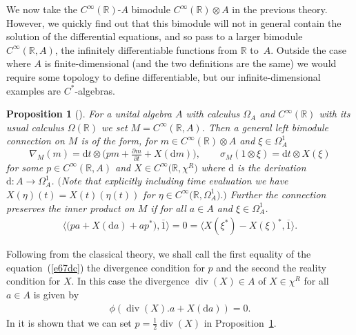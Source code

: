 \documentclass[pdftex]{sigma}
\numberwithin{equation}{section}
\newtheorem{Proposition}[Theorem]{Proposition}
 { \theoremstyle{definition}
\newtheorem{Definition}[Theorem]{Definition}
\newtheorem{Note}[Theorem]{Note}
\newtheorem{Example}[Theorem]{Example}
\newtheorem{Remark}[Theorem]{Remark} }
\newcommand{\extd}{\mathrm{d}}
\newcommand{\tens}{\mathop{\otimes}}
\newcommand{\R}{\mathbb{R}}
\newcommand{\<}{\langle}
\renewcommand{\>}{\rangle}
\begin{document}
We now take the $ C^{\infty}(\R) $-$ A $ bimodule $ C^{\infty}(\R) \tens A $ in the previous theory. However, we quickly find out that this bimodule will not in general contain the solution of the differential equations, and so pass to a larger bimodule $ C^{\infty}(\R, A) $, the infinitely differentiable functions from $ \R $ to~$ A $. Outside the case where $ A $ is finite-dimensional (and the two definitions are the same) we would require some topology to define differentiable, but our infinite-dimensional examples are $ C^{*} $-algebras.
\begin{Proposition}[\cite{Bgeo}] \label{prido}
	For a unital algebra $A$ with calculus $\Omega_A$ and $C^\infty(\R)$ with its usual calculus $\Omega(\R)$ we set $M=C^{\infty}(\R, A) $. Then a general left bimodule connection on $M$ is of the form, for $m\in C^\infty(\R)\tens A$ and $\xi\in\Omega^1_A$
	\[
	\nabla_M(m)=\extd t\tens \big(pm + \tfrac{\partial m}{\partial t} +X(\extd m)\big),\qquad \sigma_M(1\tens\xi)=\extd t\tens X(\xi)
	\]
	for some $p\in C^{\infty}(\R, A)$ and $X\in C^{\infty}\big(\R, \chi ^R\big)$ where $ \extd$ is the derivation $ \extd\colon A\rightarrow \Omega_{A}^{1} $. $\big($Note that explicitly including time evaluation we have
	$X(\eta)(t)=X(t)(\eta(t))$ for $\eta\in C^{\infty}\big(\R, \Omega^1_A\big).\big)$ Further the connection preserves the inner product on $M$ if for all $a\in A$ and $\xi\in\Omega^1_A$.
	\begin{gather}\label{e67dc}
			\<\big(pa+X(\extd a)+ap^*
		\big),\overline{1}\>=0 =\<X(\xi^*)-X(\xi)^*,\overline{1}\>.
	\end{gather}
\end{Proposition}

Following from the classical theory, we shall call the first equality of the equation~(\ref{e67dc}) the divergence condition for $p$ and the second the reality condition for $X$. In this case the divergence $ \operatorname{div} (X) \in A $ of $ X \in \chi^{R} $ for all $ a \in A $ is given by
\begin{align*}
\phi (\operatorname{div} (X).a+X(\extd a))=0.
\end{align*}
In \cite{Bgeo} it is shown that we can set $ p= \frac{1}{2} \operatorname{div} (X) $ in Proposition~\ref{prido}.
\end{document}

